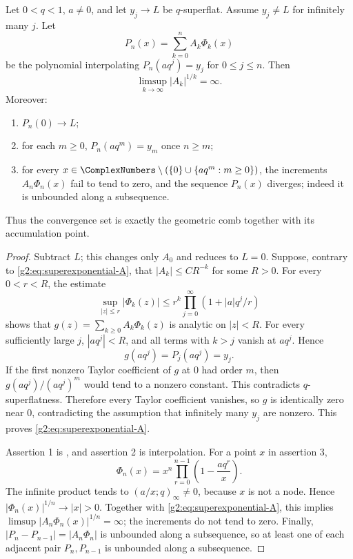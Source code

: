 \begin{theorem}
\label{g2:thm:superflat-divergence}
Let $0<q<1$, $a\ne0$, and let $y_j\to L$ be $q$-superflat.  Assume
$y_j\ne L$ for infinitely many $j$.  Let
\begin{equation}
 P_n(x)=\sum_{k=0}^n A_k\Phi_k(x)
 \label{g2:eq:superflat-newton}
\end{equation}
be the polynomial interpolating $P_n(aq^j)=y_j$ for $0\le j\le n$.  Then
\begin{equation}
 \limsup_{k\to\infty}|A_k|^{1/k}=\infty.
 \label{g2:eq:superexponential-A}
\end{equation}
Moreover:
\begin{enumerate}
\item $P_n(0)\to L$;
\item for each $m\ge0$, $P_n(aq^m)=y_m$ once $n\ge m$;
\item for every $x\in\ComplexNumbers\setminus(\{0\}\cup\{aq^m:m\ge0\})$, the increments
      $A_n\Phi_n(x)$ fail to tend to zero, and the sequence $P_n(x)$ diverges;
      indeed it is unbounded along a subsequence.
\end{enumerate}
Thus the convergence set is exactly the geometric comb together with its
accumulation point.
\end{theorem}

\begin{proof}
Subtract $L$; this changes only $A_0$ and reduces to $L=0$.  Suppose, contrary
to \eqref{g2:eq:superexponential-A}, that $|A_k|\le CR^{-k}$ for some $R>0$.
For every $0<r<R$, the estimate
\[
 \sup_{|z|\le r}|\Phi_k(z)|
 \le r^k\prod_{j=0}^\infty(1+|a|q^j/r)
\]
shows that $g(z)=\sum_{k\ge0}A_k\Phi_k(z)$ is analytic on $|z|<R$.
For every sufficiently large $j$, $|aq^j|<R$, and all terms with $k>j$
vanish at $aq^j$.  Hence
\[
 g(aq^j)=P_j(aq^j)=y_j.
\]
If the first nonzero Taylor coefficient of $g$ at $0$ had order $m$, then
$g(aq^j)/(aq^j)^m$ would tend to a nonzero constant.  This contradicts
$q$-superflatness.  Therefore every Taylor coefficient vanishes, so $g$ is
identically zero near $0$, contradicting the assumption that infinitely many
$y_j$ are nonzero.  This proves \eqref{g2:eq:superexponential-A}.

Assertion 1 is , and assertion 2 is interpolation.
For a point $x$ in assertion 3,
\begin{equation}
 \Phi_n(x)=x^n\prod_{r=0}^{n-1}\left(1-\frac{aq^r}{x}\right).
 \label{g2:eq:basis-fixed-x}
\end{equation}
The infinite product tends to $(a/x;q)_\infty\ne0$, because $x$ is not a
node.  Hence $|\Phi_n(x)|^{1/n}\to|x|>0$.  Together with
\eqref{g2:eq:superexponential-A}, this implies
\(
 \limsup|A_n\Phi_n(x)|^{1/n}=\infty
\); the increments do not tend to zero.  Finally,
$|P_n-P_{n-1}|=|A_n\Phi_n|$ is unbounded along a subsequence, so at least one
of each adjacent pair $P_n,P_{n-1}$ is unbounded along a subsequence.
\end{proof}


